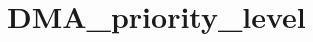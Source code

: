 \hypertarget{group___d_m_a__priority__level}{\section{D\-M\-A\-\_\-priority\-\_\-level}
\label{group___d_m_a__priority__level}
}
